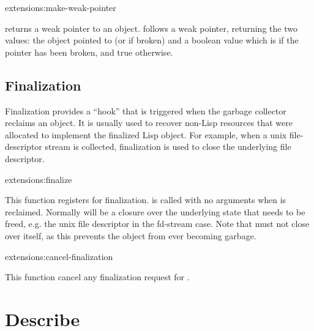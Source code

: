 \begin{defun}{extensions:}{make-weak-pointer}{}
  
   returns a weak pointer to an object.
   follows a weak pointer, returning the two
  values: the object pointed to (or \false{} if broken) and a boolean
  value which is \false{} if the pointer has been broken, and true
  otherwise.
\end{defun}


\subsection{Finalization}

Finalization provides a ``hook'' that is triggered when the garbage
collector reclaims an object.  It is usually used to recover non-Lisp
resources that were allocated to implement the finalized Lisp object.
For example, when a unix file-descriptor stream is collected,
finalization is used to close the underlying file descriptor.

\begin{defun}{extensions:}{finalize}{}
  
  This function registers  for finalization.
   is called with no arguments when  is
  reclaimed.  Normally  will be a closure over the
  underlying state that needs to be freed, e.g. the unix file
  descriptor in the fd-stream case.  Note that  must not
  close over  itself, as this prevents the object from
  ever becoming garbage.
\end{defun}

\begin{defun}{extensions:}{cancel-finalization}{}
  
  This function cancel any finalization request for .
\end{defun}


\section{Describe}

